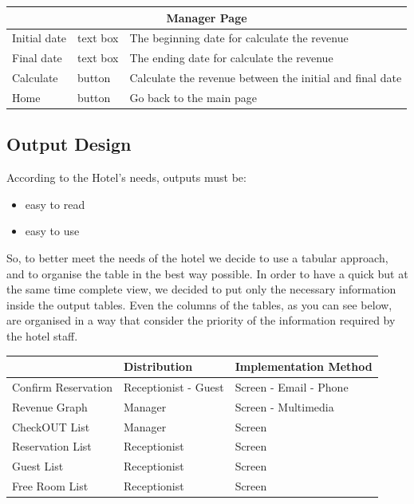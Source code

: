 \begin{center}
\begin{longtable}{| l | l | p{7cm} |}
	\hline \hline
	\multicolumn{3}{|c|}{\textbf{Manager Page}} \\
	\hline	\hline
	Initial date	& text box		& The beginning date for calculate the revenue \\
	Final date		& text box		& The ending date for calculate the revenue \\
	Calculate		& button		& Calculate the revenue between the initial and final date \\
	Home			& button		& Go back to the main page \\
	\hline
	\end{longtable}
\end{center}

\subsection{Output Design}

According to the Hotel’s needs, outputs must be:

\begin{itemize}
  \item easy to read
  \item easy to use
\end{itemize}

So, to better meet the needs of the hotel we decide to use a tabular approach, and to organise the table in the best way possible. In order to have a quick but at the same time complete view, we decided to put only the necessary information inside the output tables. Even the columns of the tables, as you can see below, are organised in a way that consider the priority of the information required by the hotel staff. 

\begin{table}[h]
\begin{tabular}{|l|l|l|}
\hline
                    & Distribution         & Implementation Method  \\ \hline
Confirm Reservation & Receptionist - Guest & Screen - Email - Phone \\ \hline
Revenue Graph       & Manager              & Screen - Multimedia    \\ \hline
CheckOUT List       & Manager              & Screen                 \\ \hline
Reservation List    & Receptionist         & Screen                 \\ \hline
Guest List          & Receptionist         & Screen                 \\ \hline
Free Room List      & Receptionist         & Screen                 \\ \hline
\end{tabular}
\end{table}


